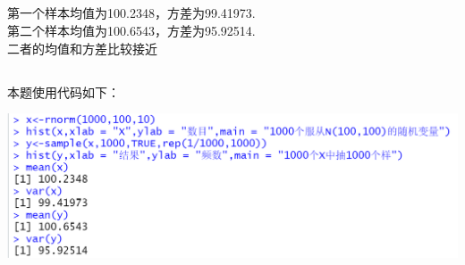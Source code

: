 \documentclass{article}
\begin{document}
\begin{CJK}{UTF8}{gbsn}
\subsection{}
第一个样本均值为100.2348，方差为99.41973.
\\第二个样本均值为100.6543，方差为95.92514.
\\二者的均值和方差比较接近
\subsection{}
本题使用代码如下：
\\
\begin{minipage}{0.5\textwidth}
    \includegraphics[scale=0.6]{code.png}
\end{minipage}
\end{CJK}
\end{document}
